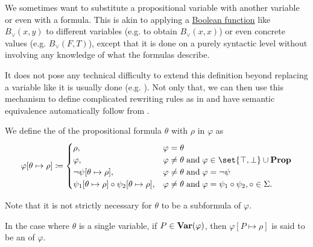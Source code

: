 \begin{definition}\label{def:propositional_substitution}
  We sometimes want to substitute a propositional variable with another variable or even with a formula. This is akin to applying a \hyperref[def:boolean_function]{Boolean function} like \( B_\vee(x, y) \) to different variables (e.g. to obtain \( B_\vee(x, x) \)) or even concrete values (e.g. \( B_\vee(F, T) \)), except that it is done on a purely syntactic level without involving any knowledge of what the formulas describe.

  It does not pose any technical difficulty to extend this definition beyond replacing a variable like it is usually done (e.g. \cite[def. 7.8]{OpenLogicFull}). Not only that, we can then use this mechanism to define complicated rewriting rules as in  and have semantic equivalence automatically follow from .

  \begin{thmenum}
     We define the  of the propositional formula \( \theta \) with \( \rho \) in \( \varphi \) as
    \begin{equation}\label{eq:def:propositional_substitution/single}
      \varphi[\theta \mapsto \rho] \coloneqq \begin{cases}
        \rho,                                                             &\varphi = \theta \\
        \varphi,                                                          &\varphi \neq \theta \T{and} \varphi \in \set{ \top, \bot } \cup \boldop{Prop} \\
        \neg \psi[\theta \mapsto \rho],                                   &\varphi \neq \theta \T{and} \varphi = \neg \psi \\
        \psi_1[\theta \mapsto \rho] \bincirc \psi_2[\theta \mapsto \rho], &\varphi \neq \theta \T{and} \varphi = \psi_1 \bincirc \psi_2, \circ \in \Sigma.
      \end{cases}
    \end{equation}

    Note that it is not strictly necessary for \( \theta \) to be a subformula of \( \varphi \).

    In the case where \( \theta \) is a single variable, if \( P \in \operatorname{\mathbf{Var}}(\varphi) \), then \( \varphi[P \mapsto \rho] \) is said to be an  of \( \varphi \).


\end{thmenum}
\end{definition}
